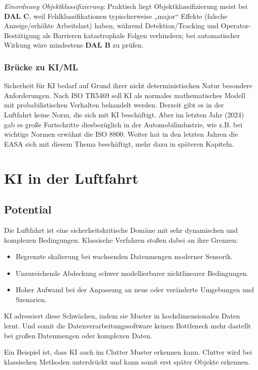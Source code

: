 \textit{Einordnung Objektklassifizierung:} Praktisch liegt Objektklassifizierung meist bei \textbf{DAL C}, weil Fehlklassifikationen typischerweise „major“ Effekte (falsche Anzeige/erhöhte Arbeitslast) haben, während Detektion/Tracking und Operator-Bestätigung als Barrieren katastrophale Folgen verhindern; bei automatischer Wirkung wäre mindestens \textbf{DAL B} zu prüfen.

\subsection{Brücke zu KI/ML}
Sicherheit für KI bedarf auf Grund ihrer nicht deterministischen Natur besondere Anforderungen.
Nach ISO TR5469 soll KI als normales mathematisches Modell mit probabilistischen Verhalten behandelt werden.
Derzeit gibt es in der Luftfahrt keine Norm, die sich mit KI beschäftigt. 
Aber im letzten Jahr (2024) gab es große Fortschritte diesbezüglich in der Automobilindustrie, wie z.B. bei wichtige Normen erwähnt die ISO 8800.
Weiter hat in den letzten Jahren die EASA sich mit diesem Thema beschäftigt, mehr dazu in späteren Kapiteln.









\chapter{KI in der Luftfahrt}
\section{Potential} 
Die Luftfahrt ist eine sicherheitskritische Domäne mit sehr dynamischen und komplexen Bedingungen. 
Klassische Verfahren stoßen dabei an ihre Grenzen:
\begin{itemize}
  \item Begrenzte skalierung bei wachsenden Datenmengen moderner Sensorik.
  \item Unzureichende Abdeckung schwer modellierbarer nichtlinearer Bedingungen.
  \item Hoher Aufwand bei der Anpassung an neue oder veränderte Umgebungen und Szenarien.
\end{itemize}
KI adressiert diese Schwächen, indem sie Muster in hochdimensionalen Daten lernt. Und somit die 
Datenverarbeitungssoftware keinen Bottleneck mehr dastellt bei großen Datenmengen oder komplexen Daten.

Ein Beispiel ist, dass KI auch im Clutter Muster erkennen kann. Clutter wird bei klassischen Methoden 
unterdrückt und kann somit erst später Objekte erkennen.

